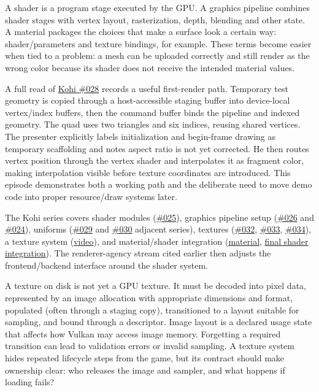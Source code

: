 \hypertarget{06-engine-ii-ch026-treat-shaders-and-materials-as-a-pipeline-not-just-files}{}

A shader is a program stage executed by the GPU. A graphics pipeline combines shader stages with vertex layout, rasterization, depth, blending and other state. A material packages the choices that make a surface look a certain way: shader/parameters and texture bindings, for example. These terms become easier when tied to a problem: a mesh can be uploaded correctly and still render as the wrong color because its shader does not receive the intended material values.

A full read of \href{https://www.youtube.com/watch?v=kgnc_hHVz_M}{Kohi \#028} records a useful first-render path. Temporary test geometry is copied through a host-accessible staging buffer into device-local vertex/index buffers, then the command buffer binds the pipeline and indexed geometry. The quad uses two triangles and six indices, reusing shared vertices. The presenter explicitly labels initialization and begin-frame drawing as temporary scaffolding and notes aspect ratio is not yet corrected. He then routes vertex position through the vertex shader and interpolates it as fragment color, making interpolation visible before texture coordinates are introduced. This episode demonstrates both a working path and the deliberate need to move demo code into proper resource/draw systems later.

The Kohi series covers shader modules (\href{https://www.youtube.com/watch?v=01KQiQ4fdXs}{\#025}), graphics pipeline setup (\href{https://www.youtube.com/watch?v=OmPmftW7Kjg}{\#026} and \href{https://www.youtube.com/watch?v=KanKG-vd9GA}{\#024}), uniforms (\href{https://www.youtube.com/watch?v=yc40ixalLtU}{\#029} and \href{https://www.youtube.com/watch?v=xGonaV-OB7E}{\#030} adjacent series), textures (\href{https://www.youtube.com/watch?v=u-eyZCV_MRs}{\#032}, \href{https://www.youtube.com/watch?v=n7qS96720yI}{\#033}, \href{https://www.youtube.com/watch?v=2IxHj52-Kag}{\#034}), a texture system (\href{https://www.youtube.com/watch?v=hDpzfAdW3vw}{video}), and material/shader integration (\href{https://www.youtube.com/watch?v=K_jD7--h7F8}{material}, \href{https://www.youtube.com/watch?v=9nP3aBsrCXs}{final shader integration}). The renderer-agency stream cited earlier then adjusts the frontend/backend interface around the shader system.

A texture on disk is not yet a GPU texture. It must be decoded into pixel data, represented by an image allocation with appropriate dimensions and format, populated (often through a staging copy), transitioned to a layout suitable for sampling, and bound through a descriptor. Image layout is a declared usage state that affects how Vulkan may access image memory. Forgetting a required transition can lead to validation errors or invalid sampling. A texture system hides repeated lifecycle steps from the game, but its contract should make ownership clear: who releases the image and sampler, and what happens if loading fails?

